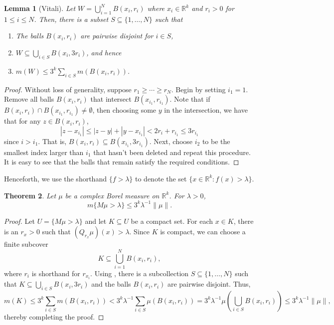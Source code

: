 \documentclass[12pt]{article}
\theoremstyle{thmstyle}
\newtheorem{theorem}{Theorem}[section]
\newtheorem{lemma}[theorem]{Lemma}
\theoremstyle{defstyle}
\newcommand{\R}{\mathbb{R}}
\renewcommand{\le}{\leqslant}
\renewcommand{\ge}{\geqslant}
\begin{document}
\begin{lemma}[Vitali]
    Let $\displaystyle W = \bigcup_{i = 1}^N B(x_i, r_i)$ where $x_i\in\R^k$ and $r_i > 0$ for $1\le i\le N$. Then, there is a subset $S\subseteq\{1,\dots, N\}$ such that 
    \begin{enumerate}[label=(\alph*)]
        \item The balls $B(x_i, r_i)$ are pairwise disjoint for $i\in S$,
        \item $\displaystyle W\subseteq\bigcup_{i\in S} B(x_i, 3r_i)$, and hence
        \item $\displaystyle m(W)\le 3^k\sum_{i\in S} m(B(x_i, r_i))$.
    \end{enumerate}
\end{lemma}
\begin{proof}
    Without loss of generality, suppose $r_1\ge\cdots\ge r_N$. Begin by setting $i_1 =1$. Remove all balls $B(x_i, r_i)$ that intersect $B(x_{i_1}, r_{i_1})$. Note that if $B(x_i, r_i)\cap B(x_{i_1}, r_{i_1})\ne\emptyset$, then choosing some $y$ in the intersection, we have that for any $z\in B(x_i, r_i)$, 
    \begin{equation*}
        |z- x_{i_1}|\le |z - y| + |y - x_{i_1}| < 2r_i + r_{i_1}\le 3r_{i_1}
    \end{equation*}
    since $i > i_1$. That is, $B(x_i, r_i)\subseteq B(x_{i_1}, 3r_{i_1})$. Next, choose $i_2$ to be the smallest index larger than $i_1$ that hasn't been deleted and repeat this procedure. It is easy to see that the balls that remain satisfy the required conditions.
\end{proof}

Henceforth, we use the shorthand $\{f >\lambda\}$ to denote the set $\{x\in\R^k\colon f(x) > \lambda\}$.

\begin{theorem}
    Let $\mu$ be a complex Borel measure on $\R^k$. For $\lambda > 0$, 
    \begin{equation*}
        m\{M\mu > \lambda\}\le 3^k\lambda^{-1}\|\mu\|.
    \end{equation*}
\end{theorem}
\begin{proof}
    Let $U = \{M\mu > \lambda\}$ and let $K\subseteq U$ be a compact set. For each $x\in K$, there is an $r_x > 0$ such that $(Q_{r_x}\mu)(x) > \lambda$. Since $K$ is compact, we can choose a finite subcover 
    \begin{equation*}
        K\subseteq \bigcup_{i = 1}^N B(x_i, r_i),
    \end{equation*}
    where $r_i$ is shorthand for $r_{x_i}$. Using , there is a subcollection $S\subseteq\{1,\dots, N\}$ such that $\displaystyle K\subseteq\bigcup_{i\in S} B(x_i, 3r_i)$ and the balls $B(x_i, r_i)$ are pairwise disjoint. Thus, 
    \begin{equation*}
        m(K)\le 3^k\sum_{i\in S}m(B(x_i, r_i)) < 3^k\lambda^{-1}\sum_{i\in S}\mu(B(x_i, r_i)) = 3^k\lambda^{-1}\mu\left(\bigcup_{i\in S} B(x_i, r_i)\right)\le 3^k\lambda^{-1}\|\mu\|,
    \end{equation*}
    thereby completing the proof.
\end{proof}
\end{document}
